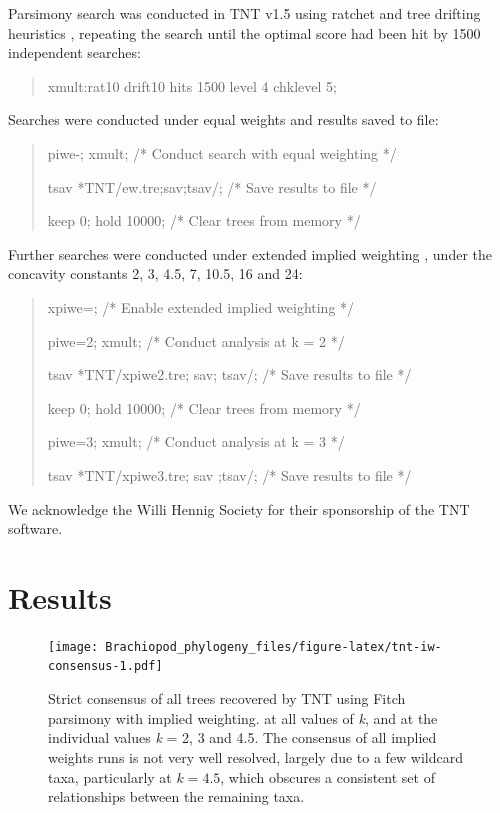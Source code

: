 \documentclass[openany]{book}
\theoremstyle{definition}
\theoremstyle{definition}
\theoremstyle{definition}
\theoremstyle{remark}
\begin{document}
Parsimony search was conducted in TNT v1.5 \citep{Goloboff2016} using
ratchet and tree drifting heuristics \citep{Goloboff1999, Nixon1999},
repeating the search until the optimal score had been hit by 1500
independent searches:

\begin{quote}
xmult:rat10 drift10 hits 1500 level 4 chklevel 5;
\end{quote}

Searches were conducted under equal weights and results saved to file:

\begin{quote}
piwe-; xmult; {/* Conduct search with equal weighting */}

tsav *TNT/ew.tre;sav;tsav/; {/* Save results to file */}

keep 0; hold 10000; {/* Clear trees from memory */}
\end{quote}

Further searches were conducted under extended implied weighting
\citep{Goloboff1997, Goloboff2014}, under the concavity constants 2, 3,
4.5, 7, 10.5, 16 and 24:

\begin{quote}
xpiwe=; {/* Enable extended implied weighting */}

piwe=2; xmult; {/* Conduct analysis at k = 2 */}

tsav *TNT/xpiwe2.tre; sav; tsav/; {/* Save results to file */}

keep 0; hold 10000; {/* Clear trees from memory */}

piwe=3; xmult; {/* Conduct analysis at k = 3 */}

tsav *TNT/xpiwe3.tre; sav ;tsav/; {/* Save results to file */}
\end{quote}

We acknowledge the Willi Hennig Society for their sponsorship of the TNT
software.

\section{Results}\label{results-1}









\begin{figure}
\centering
\texttt{[image: Brachiopod\_phylogeny\_files/figure-latex/tnt-iw-consensus-1.pdf]}
\caption{\label{fig:tnt-iw-consensus}Strict consensus of all trees recovered by TNT
using Fitch parsimony with implied weighting.
at all values of \emph{k}, and at the individual
values \emph{k} = 2, 3 and 4.5. The consensus of all implied weights runs is
not very well resolved, largely due to a few wildcard taxa, particularly
at \(k = 4.5\), which obscures a consistent set of relationships between
the remaining taxa.}
\end{figure}
\end{document}
